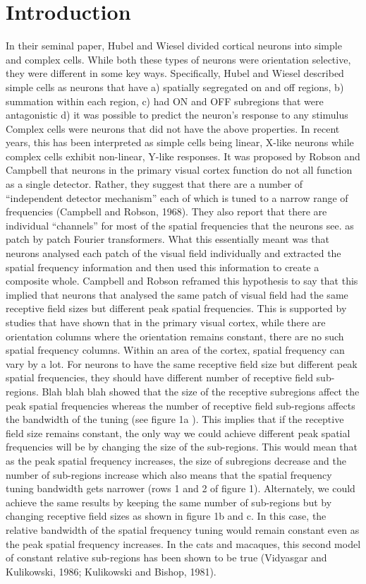 	\section{Introduction}
	In their seminal paper, Hubel and Wiesel divided cortical neurons into simple and complex cells. While both these types of neurons were orientation selective, they were different in some key ways. Specifically, Hubel and Wiesel described simple cells as neurons that have
	a) spatially segregated on and off regions, 
	b) summation within each region, 
	c) had ON and OFF subregions that were antagonistic 
	d) it was possible to predict the neuron’s response to any stimulus
	Complex cells were neurons that did not have the above properties. In recent years, this has been interpreted as simple cells being linear, X-like neurons while complex cells exhibit non-linear, Y-like responses. 
	It was proposed by Robson and Campbell that neurons in the primary visual cortex function do not all function as a single detector. Rather, they suggest that there are a number of “independent detector mechanism” each of which is tuned to a narrow range of frequencies (Campbell and Robson, 1968).  They also report that there are individual “channels” for most of the spatial frequencies that the neurons see. as patch by patch Fourier transformers. What this essentially meant was that neurons analysed each patch of the visual field individually and extracted the spatial frequency information and then used this information to create a composite whole. Campbell and Robson reframed this hypothesis to say that this implied that neurons that analysed the same patch of visual field had the same receptive field sizes but different peak spatial frequencies. This is supported by studies that have shown that in the primary visual cortex, while there are orientation columns where the orientation remains constant, there are no such spatial frequency columns. Within an area of the cortex, spatial frequency can vary by a lot.
	For neurons to have the same receptive field size but different peak spatial frequencies, they should have different number of receptive field sub-regions. Blah blah blah showed that the size of the receptive subregions affect the peak spatial frequencies whereas the number of receptive field sub-regions affects the bandwidth of the tuning (see figure 1a ). This implies that if the receptive field size remains constant, the only way we could achieve different peak spatial frequencies will be by changing the size of the sub-regions. This would mean that as the peak spatial frequency increases, the size of subregions decrease and the number of sub-regions increase which also means that the spatial frequency tuning bandwidth gets narrower (rows 1 and 2 of figure 1). Alternately, we could achieve the same results by keeping the same number of sub-regions but by changing receptive field sizes as shown in figure 1b and c. In this case, the relative bandwidth of the spatial frequency tuning would remain constant even as the peak spatial frequency increases. In the cats and macaques, this second model of constant relative sub-regions has been shown to be true (Vidyasgar and Kulikowski, 1986; Kulikowski and Bishop, 1981).
